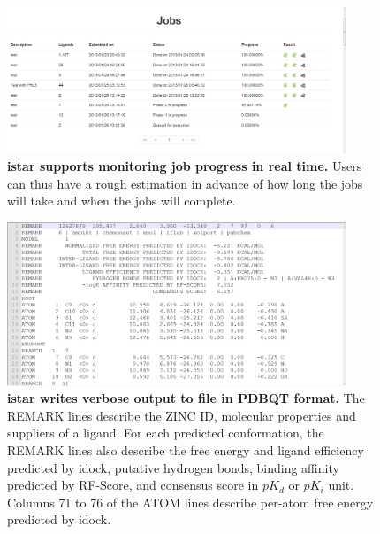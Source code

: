 \documentclass[10pt]{article}
\begin{document}
\begin{figure}[!ht]
\begin{center}
\includegraphics[width=4in]{Progress.eps}
\end{center}
\caption{
{\bf istar supports monitoring job progress in real time.} Users can thus have a rough estimation in advance of how long the jobs will take and when the jobs will complete.
}
\label{Progress}
\end{figure}

\begin{figure}[!ht]
\begin{center}
\includegraphics[width=4in]{OutputPDBQT.eps}
\end{center}
\caption{
{\bf istar writes verbose output to file in PDBQT format.} The REMARK lines describe the ZINC ID, molecular properties and suppliers of a ligand. For each predicted conformation, the REMARK lines also describe the free energy and ligand efficiency predicted by idock, putative hydrogen bonds, binding affinity predicted by RF-Score, and consensus score in $pK_d$ or $pK_i$ unit. Columns 71 to 76 of the ATOM lines describe per-atom free energy predicted by idock.
}
\label{OutputPDBQT}
\end{figure}
\end{document}
